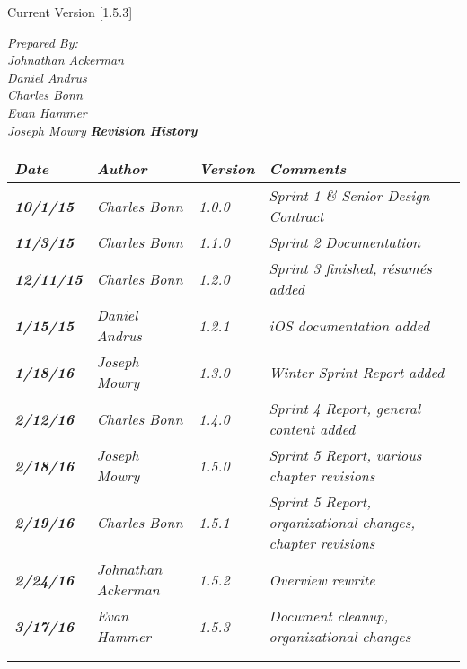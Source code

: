 


Current Version [1.5.3]
\vspace*{5mm}

{\color{SDColor5}
\noindent
\textit{Prepared By:}\\
\textit{Johnathan Ackerman}\\
\textit{Daniel Andrus}\\
\textit{Charles Bonn}\\
\textit{Evan Hammer}\\
\textit{Joseph Mowry}
}
\vfill
\noindent
{\color{SDColor3} \textit{\textbf{Revision History}}}\\
\begin{tabular}{|>{\raggedright}p{1.5cm}|>{\raggedright}p{3cm}|>{\raggedright}p{1.5cm}|>{\raggedright}p{9cm}|}
\hline
\textit{\textbf{Date}} &  \textit{\textbf{Author}} & \textit{\textbf{Version}} & \textit{\textbf{Comments}}\tabularnewline
\hline
 \textit{\textbf{10/1/15}} & \textit{Charles Bonn} & \textit{1.0.0} & \textit{Sprint 1 \& Senior Design Contract}\tabularnewline
 \hline
  \textit{\textbf{11/3/15}} & \textit{Charles Bonn} & \textit{1.1.0} & \textit{Sprint 2 Documentation}\tabularnewline
 \hline
 \textit{\textbf{12/11/15}} & \textit{Charles Bonn} & \textit{1.2.0} & \textit{Sprint 3 finished, résumés added}\tabularnewline
\hline
 \textit{\textbf{1/15/15}} & \textit{Daniel Andrus} & \textit{1.2.1} & \textit{iOS documentation added}\tabularnewline
\hline
 \textit{\textbf{1/18/16}} & \textit{Joseph Mowry} & \textit{1.3.0} & \textit{Winter Sprint Report added}\tabularnewline
\hline
 \textit{\textbf{2/12/16}} & \textit{Charles Bonn} & \textit{1.4.0} & \textit{Sprint 4 Report, general content added}\tabularnewline
\hline
 \textit{\textbf{2/18/16}} & \textit{Joseph Mowry} & \textit{1.5.0} & \textit{Sprint 5 Report, various chapter revisions}\tabularnewline
\hline
 \textit{\textbf{2/19/16}} & \textit{Charles Bonn} & \textit{1.5.1} & \textit{Sprint 5 Report, organizational changes, chapter revisions}\tabularnewline
\hline
 \textit{\textbf{2/24/16}} & \textit{Johnathan Ackerman} & \textit{1.5.2} & \textit{Overview rewrite}\tabularnewline
\hline
 \textit{\textbf{3/17/16}} & \textit{Evan Hammer} & \textit{1.5.3} & \textit{Document cleanup, organizational changes}\tabularnewline
\hline
\textit{\textbf{}} & \textit{} & \textit{} & \textit{}\tabularnewline
 &  &  & \tabularnewline
\hline
\end{tabular}
\vfill

